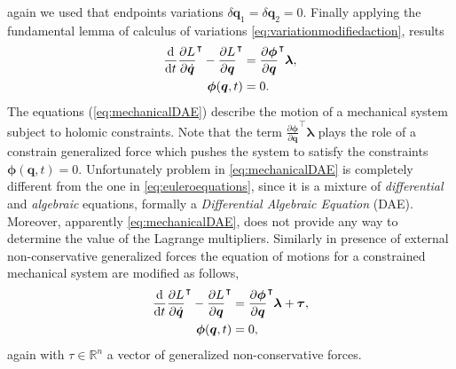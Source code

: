 		again we used that endpoints variations
		$\delta\bm{q}_{1} = \delta\bm{q}_{2} = 0$.
		Finally applying the fundamental lemma of calculus of
		variations \cref{eq:variationmodifiedaction}, results
		\begin{subequations}
			\label{eq:mechanicalDAE}
			\begin{align}
				\frac{\mathop{}\!\mathrm{d}}{\mathop{}\!\mathrm{d} t}\frac{\partial L}{\partial\dot{\bm{q}}}^{\intercal}
				-\frac{\partial L}{\partial \bm{q}}^{\intercal}
				&= \frac{\partial\bm{\phi}}{\partial\bm{q}}^{\intercal}\bm{\lambda}, \\
				\bm{\phi}(\bm{q},t) &= 0.
			\end{align}
		\end{subequations}
		The equations (\ref{eq:mechanicalDAE}) describe the motion of a mechanical
		system subject to holomic constraints.
		Note that the term $\frac{\partial\bm{\phi}}{\partial\bm{q}}^{\intercal}\bm{\lambda}$
		plays the role of a constrain generalized force which pushes the system to
		satisfy the constraints $\bm{\phi}(\bm{q},t) = 0$.
		Unfortunately problem in \cref{eq:mechanicalDAE} is completely different
		from the one in \cref{eq:euleroequations}, since it is a mixture of
		\emph{differential} and \emph{algebraic} equations, formally a
		\emph{Differential Algebraic Equation} (DAE).
		Moreover, apparently \cref{eq:mechanicalDAE}, does not provide any
		way to determine the value of the Lagrange multipliers.
		Similarly in presence of external non-conservative generalized
		forces the equation of motions for a constrained mechanical
		system are modified as follows,
		\begin{subequations}
			\begin{align}
				\frac{\mathop{}\!\mathrm{d}}{\mathop{}\!\mathrm{d} t}\frac{\partial L}{\partial\dot{\bm{q}}}^{\intercal}
				-\frac{\partial L}{\partial \bm{q}}^{\intercal}
				&= \frac{\partial\bm{\phi}}{\partial\bm{q}}^{\intercal}\bm{\lambda}+\bm{\tau},\\
				\bm{\phi}(\bm{q},t) &= 0,
			\end{align}
		\end{subequations}
		again with $\tau\in\mathbb{R}^{n}$ a vector of generalized non-conservative forces.
